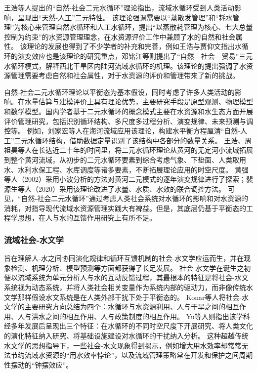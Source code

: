 王浩等人提出的“自然-社会二元水循环”理论指出，流域水循环受到人类活动影响，呈现出“天然-人工”二元特性\cite{wang2006}。
该理论强调需要以“蒸散发管理”和“耗水管理”为核心来管理自然水循环和人工水循环，提出“以蒸散耗管理为核心、七大总量控制为约束”的水资源管理理念，在水资源评价工作中兼顾了水的自然和社会属性\cite{wang2010}。
该理论的发展也得到了不少学者的补充和完善，例如王浩与贾仰文指出水循环的演变效应也是该理论的研究重点\cite{wang2016}，邓铭江等则提出了“自然—社会—贸易”三元水循环模式，解释西北干旱区内陆河流域水循环的机理\cite{deng2020}。该理论的提出强调了水资源管理需要考虑自然和社会属性，对于水资源的评价和管理带来了新的挑战。

自然-社会二元水循环理论以平衡态为基本假设，同时考虑了许多人类活动的影响。在水量估算与建模评价上具有理论优势，主要研究手段是原型观测、物理模型和数学模型。国内学者基于二元水循环的概念模式主要在水资源和水生态方面开展评价管理研究，包括识别循环结构、多尺度多过程分析、演变规律、未来预测与调控等\cite{wang2016}。
例如，刘家宏等人在海河流域应用该理论，构建水平衡方程厘清“自然-人工”二元水循环结构，借助数据定量识别了该结构中各部分的数量关系\cite{liu2010}。
王浩\cite{wang2004}、周祖昊\cite{zhou2022a}等人在长达近二十年的时间里，将二元水循环理论从黄河的无定河小流域拓展到整个黄河流域，从初步的二元水循环要素到综合考虑气象、下垫面、人类取用水、水利水保工程、水库调度等诸多要素，不断拓展理论应用的时空尺度。
黄强等人（2002）采用小波分析的方法对黄河二元模式的逐年演变规律进行了探索\cite{huang2002}；裴源生等人（2020）采用该理论改进了水量、水质、水效的联合调控方法\cite{pei2020}。
可见，“自然-社会二元水循环”通过考虑人类社会系统对水循环的影响和对水资源的消耗，对指导现代流域水资源管理实践大有裨益。但是，其底层仍基于平衡态的工程学思想，在人与水的互馈作用研究上有所不足。

\subsubsection*{流域社会-水文学}

旨在理解人-水之间协同演化规律和循环互馈机制的社会-水文学应运而生，并在现象检测、机理分析、模型预测等方面都获得了长足发展\cite{sivapalan2012, blair2016, srinivasan2016}。
社会-水文学在诞生之初便以流域系统为单元分析人与水的互动反馈过程，其最根本的特征是将社会-水文系统视为动态系统，并将人类社会相关变量作为系统内部的驱动力，而非像传统水文学那样假设水文系统是在人类外部干扰下处于平衡态的\cite{sivapalan2012}。
Konar等人将社会-水文学的主要研究方向总结为四个：水循环与水资源利用、人与干旱之间的相互作用、人与洪水之间的相互作用、人与政策制度的相互作用\cite{konar2019}。
Yu等人则指出该学科经多年发展后呈现出三个特征：在水循环的不同时空尺度下开展研究、将人类文化的演化特征纳入研究、将基础设施建设对水循环的干扰纳入分析\cite{yu2020}。
这种超越传统水文学的思想指导下，一些社会-水文现象得到揭示，例如增大用水效率却常常无法节约流域水资源的“用水效率悖论”\cite{grafton2018, xiong2021a}，以及流域管理策略常在开发和保护之间周期性摆动的“钟摆效应”\cite{kandasamy2014, roobavannan2017, mostert2018}。

